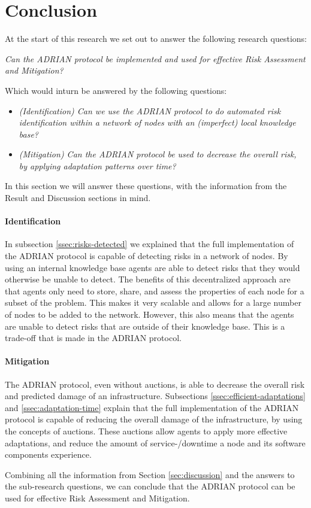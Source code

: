 \section{Conclusion}
\label{sec:conclusion}

At the start of this research we set out to answer the following research questions:

\vspace{0.5em}
\emph{Can the ADRIAN protocol be implemented and used for effective Risk Assessment and Mitigation?}
\vspace{0.5em}

Which would inturn be answered by the following questions: 
\begin{itemize}
    \item \textit{(Identification) Can we use the ADRIAN protocol to do automated risk identification within a network of nodes with an (imperfect) local knowledge base?}
    \item \textit{(Mitigation) Can the ADRIAN protocol be used to decrease the overall risk, by applying adaptation patterns over time?}
\end{itemize}

In this section we will answer these questions, with the information from the Result and Discussion sections in mind.

\paragraph*{Identification}
In subsection \ref{ssec:risks-detected} we explained that the full implementation of the ADRIAN protocol is capable of detecting risks in a network of nodes. By using an internal knowledge base agents are able to detect risks that they would otherwise be unable to detect. The benefits of this decentralized approach are that agents only need to store, share, and assess the properties of each node for a subset of the problem. This makes it very scalable and allows for a large number of nodes to be added to the network. However, this also means that the agents are unable to detect risks that are outside of their knowledge base. This is a trade-off that is made in the ADRIAN protocol. 

\paragraph*{Mitigation}
The ADRIAN protocol, even without auctions, is able to decrease the overall risk and predicted damage of an infrastructure.
Subsections \ref{ssec:efficient-adaptations} and \ref{ssec:adaptation-time} explain that the full implementation of the ADRIAN protocol is capable of reducing the overall damage of the infrastructure, by using the concepts of auctions. These auctions allow agents to apply more effective adaptations, and reduce the amount of service-/downtime a node and its software components experience. 


\vspace{0.5em}
Combining all the information from Section \ref{sec:discussion} and the answers to the sub-research questions, we can conclude that the ADRIAN protocol can be used for effective Risk Assessment and Mitigation. 
